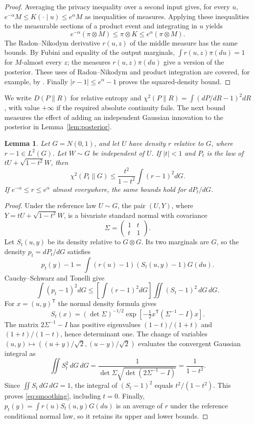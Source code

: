 \documentclass[11pt]{article}
\newtheorem{lemma}[theorem]{Lemma}
\theoremstyle{remark}
\newcommand{\KL}{D}
\begin{document}
\begin{proof}
Averaging the privacy inequality over a second input gives, for every $u$,
$e^{-\alpha}M\le K(\cdot\mid u)\le e^\alpha M$ as inequalities of
measures. Applying these inequalities to the measurable sections of a
product event and integrating in $u$ yields
\[
 e^{-\alpha}(\pi\otimes M)\le \pi\otimes K
       \le e^\alpha(\pi\otimes M).
\]
The Radon--Nikodym derivative $r(u,z)$ of the middle measure has the same
bounds. By Fubini and equality of the output marginals,
$\int r(u,z)\pi(du)=1$ for $M$-almost every $z$; the measures
$r(u,z)\pi(du)$ give a version of the posterior. These uses of
Radon--Nikodym and product integration are covered, for example, by
\cite[Theorems 1.6.6 and 1.6.12]{VH}. Finally
$|r-1|\le e^\alpha-1$ proves the squared-density bound.
\end{proof}

We write $\KL(P\|R)$ for relative entropy and
$\chi^2(P\|R)=\int(dP/dR-1)^2dR$, with value $+\infty$ if the required
absolute continuity fails. The next bound measures the effect of adding an
independent Gaussian innovation to the posterior in
Lemma~\ref{lem:posterior}.

\begin{lemma}\label{lem:smoothing}
Let $G=N(0,1)$, and let $U$ have density $r$ relative to $G$, where
$r-1\in L^2(G)$. Let $W\sim G$ be independent of $U$. If $|t|<1$ and
$P_t$ is the law of $tU+\sqrt{1-t^2}W$, then
\begin{equation}\label{eq:smoothing}
 \chi^2(P_t\|G)\le\frac{t^2}{1-t^2}\int(r-1)^2dG.
\end{equation}
If $e^{-\alpha}\le r\le e^\alpha$ almost everywhere, the same bounds
hold for $dP_t/dG$.
\end{lemma}

\begin{proof}
Under the reference law $U\sim G$, the pair $(U,Y)$, where
$Y=tU+\sqrt{1-t^2}W$, is a bivariate standard normal with covariance
\[
 \Sigma=\begin{pmatrix}1&t\\t&1\end{pmatrix}.
\]
Let $S_t(u,y)$ be its density relative to $G\otimes G$. Its two marginals
are $G$, so the density $p_t=dP_t/dG$ satisfies
\[
 p_t(y)-1=\int(r(u)-1)(S_t(u,y)-1)G(du).
\]
Cauchy--Schwarz and Tonelli give
\[
 \int(p_t-1)^2dG
 \le\left[\int(r-1)^2dG\right]
       \iint(S_t-1)^2\,dG\,dG.
\]
For $x=(u,y)^{\mathsf T}$ the normal density formula gives
\[
 S_t(x)=(\det\Sigma)^{-1/2}
       \exp\!\left[-\tfrac12 x^{\mathsf T}(\Sigma^{-1}-I)x\right].
\]
The matrix $2\Sigma^{-1}-I$ has positive eigenvalues
$(1-t)/(1+t)$ and $(1+t)/(1-t)$, hence determinant one. The change of
variables $(u,y)\mapsto((u+y)/\sqrt2,(u-y)/\sqrt2)$ evaluates the
convergent Gaussian integral as
\[
 \iint S_t^2\,dG\,dG
 =\frac{1}{\det\Sigma\sqrt{\det(2\Sigma^{-1}-I)}}
 =\frac{1}{1-t^2}.
\]
Since $\iint S_t\,dG\,dG=1$, the integral of $(S_t-1)^2$ equals
$t^2/(1-t^2)$. This proves \eqref{eq:smoothing}, including $t=0$.
Finally, $p_t(y)=\int r(u)S_t(u,y)G(du)$ is an average of $r$ under
the reference conditional normal law, so it retains its upper and lower
bounds.
\end{proof}
\end{document}
